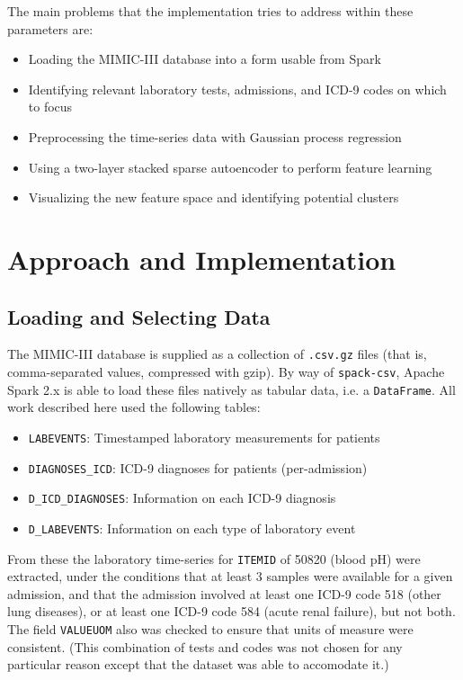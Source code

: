 \documentclass[journal]{IEEEtran}
\begin{document}

The main problems that the implementation tries to address within
these parameters are:

\begin{itemize}
\item{Loading the MIMIC-III database into a form usable from Spark}
\item{Identifying relevant laboratory tests, admissions, and ICD-9
  codes on which to focus}
\item{Preprocessing the time-series data with Gaussian process
  regression}
\item{Using a two-layer stacked sparse autoencoder to perform feature
  learning}
\item{Visualizing the new feature space and identifying potential
  clusters}
\end{itemize}

\section{Approach and Implementation}

\subsection{Loading and Selecting Data}

The MIMIC-III database is supplied as a collection of \texttt{.csv.gz}
files (that is, comma-separated values, compressed with gzip).  By way
of \texttt{spack-csv}, Apache Spark 2.x is able to load these files
natively as tabular data, i.e. a \texttt{DataFrame}.  All work
described here used the following tables\cite{Johnson2016a}:

\begin{itemize}
\item \texttt{LABEVENTS}: Timestamped laboratory measurements for patients
\item \texttt{DIAGNOSES\_ICD}: ICD-9 diagnoses for patients (per-admission)
\item \texttt{D\_ICD\_DIAGNOSES}: Information on each ICD-9 diagnosis
\item \texttt{D\_LABEVENTS}: Information on each type of laboratory event
\end{itemize}


From these the laboratory time-series for \texttt{ITEMID} of 50820
(blood pH) were extracted, under the conditions that at least 3
samples were available for a given admission, and that the admission
involved at least one ICD-9 code 518 (other lung diseases), or at
least one ICD-9 code 584 (acute renal failure), but not both.  The
field \texttt{VALUEUOM} also was checked to ensure that units of
measure were consistent.  (This combination of tests and codes was not
chosen for any particular reason except that the dataset was able to
accomodate it.)
\end{document}
